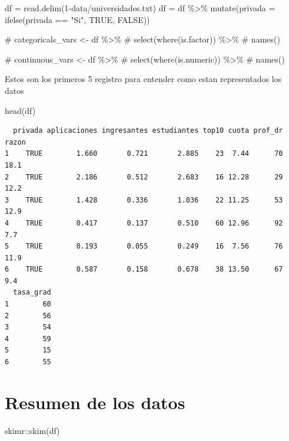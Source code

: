 \documentclass[
  letterpaper,
  DIV=11,
  numbers=noendperiod]{scrartcl}
\newenvironment{Shaded}{\begin{snugshade}}{\end{snugshade}}
\newcommand{\AttributeTok}[1]{\textcolor[rgb]{0.40,0.45,0.13}{#1}}
\newcommand{\CommentTok}[1]{\textcolor[rgb]{0.37,0.37,0.37}{#1}}
\newcommand{\ConstantTok}[1]{\textcolor[rgb]{0.56,0.35,0.01}{#1}}
\newcommand{\FunctionTok}[1]{\textcolor[rgb]{0.28,0.35,0.67}{#1}}
\newcommand{\NormalTok}[1]{\textcolor[rgb]{0.00,0.23,0.31}{#1}}
\newcommand{\OtherTok}[1]{\textcolor[rgb]{0.00,0.23,0.31}{#1}}
\newcommand{\SpecialCharTok}[1]{\textcolor[rgb]{0.37,0.37,0.37}{#1}}
\newcommand{\StringTok}[1]{\textcolor[rgb]{0.13,0.47,0.30}{#1}}
\begin{document}
\begin{Shaded}
\begin{Highlighting}[]
\NormalTok{df }\OtherTok{=} \FunctionTok{read.delim}\NormalTok{(}\StringTok{\textquotesingle{}1{-}data/universidades.txt\textquotesingle{}}\NormalTok{)}
\NormalTok{df }\OtherTok{=}\NormalTok{ df }\SpecialCharTok{\%\textgreater{}\%} 
  \FunctionTok{mutate}\NormalTok{(}\AttributeTok{privada =} \FunctionTok{ifelse}\NormalTok{(privada }\SpecialCharTok{==} \StringTok{"Si"}\NormalTok{, }\ConstantTok{TRUE}\NormalTok{, }\ConstantTok{FALSE}\NormalTok{))}

\CommentTok{\# categoricals\_vars \textless{}{-} df \%\textgreater{}\%}
\CommentTok{\#   select(where(is.factor)) \%\textgreater{}\%}
\CommentTok{\#   names()}

\CommentTok{\# continuous\_vars \textless{}{-} df \%\textgreater{}\%}
\CommentTok{\#   select(where(is.numeric)) \%\textgreater{}\%}
\CommentTok{\#   names()}
\end{Highlighting}
\end{Shaded}

Estos son los primeros 5 registro para entender como estan representados
los datos

\begin{Shaded}
\begin{Highlighting}[]
\FunctionTok{head}\NormalTok{(df)}
\end{Highlighting}
\end{Shaded}

\begin{verbatim}
  privada aplicaciones ingresantes estudiantes top10 cuota prof_dr razon
1    TRUE        1.660       0.721       2.885    23  7.44      70  18.1
2    TRUE        2.186       0.512       2.683    16 12.28      29  12.2
3    TRUE        1.428       0.336       1.036    22 11.25      53  12.9
4    TRUE        0.417       0.137       0.510    60 12.96      92   7.7
5    TRUE        0.193       0.055       0.249    16  7.56      76  11.9
6    TRUE        0.587       0.158       0.678    38 13.50      67   9.4
  tasa_grad
1        60
2        56
3        54
4        59
5        15
6        55
\end{verbatim}

\hypertarget{resumen-de-los-datos}{%
\section{Resumen de los datos}\label{resumen-de-los-datos}}

\begin{Shaded}
\begin{Highlighting}[]
\NormalTok{skimr}\SpecialCharTok{::}\FunctionTok{skim}\NormalTok{(df)}
\end{Highlighting}
\end{Shaded}
\end{document}
